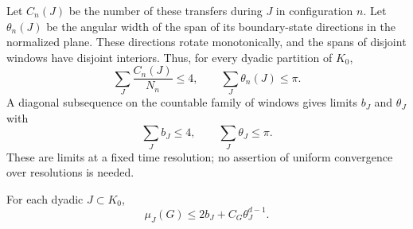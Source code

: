 Let $C_n(J)$ be the number of these transfers during $J$ in
configuration $n$. Let $\theta_n(J)$ be the angular width of the span
of its boundary-state directions in the normalized plane. These
directions rotate monotonically, and the spans of disjoint windows
have disjoint interiors. Thus, for every dyadic partition of $K_0$,
\[
 \sum_J \frac{C_n(J)}{N_n}\leq4,
 \qquad \sum_J\theta_n(J)\leq\pi.
\]
A diagonal subsequence on the countable family of windows gives
limits $b_J$ and $\theta_J$ with
\begin{equation}
 \sum_J b_J\leq4,\qquad \sum_J\theta_J\leq\pi.
 \label{eq:boundary-budgets}
\end{equation}
These are limits at a fixed time resolution; no assertion of uniform
convergence over resolutions is needed.

\begin{lemma}
\label{lem:limiting-boundary-activity}
For each dyadic $J\subset K_0$,
\begin{equation}
 \mu_J(G)\leq2b_J+C_G\theta_J^{d-1}.
 \label{eq:limiting-boundary-activity}
\end{equation}
\end{lemma}

